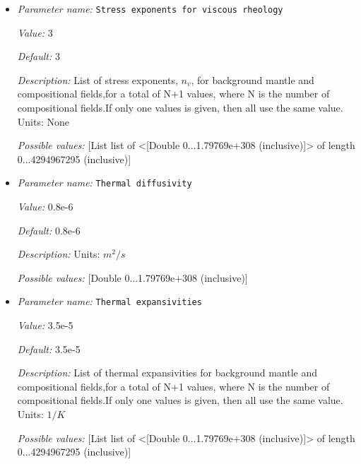 \begin{itemize}
{\it Description:} List of stress exponents, $n_p$, for background mantle and compositional fields,for a total of N+1 values, where N is the number of compositional fields.If only one values is given, then all use the same value.  Units: None


{\it Possible values:} [List list of <[Double 0...1.79769e+308 (inclusive)]> of length 0...4294967295 (inclusive)]
\item {\it Parameter name:} {\tt Stress exponents for viscous rheology}
\label{parameters:Material model/Morency and Doin/Stress exponents for viscous rheology}


{\it Value:} 3


{\it Default:} 3


{\it Description:} List of stress exponents, $n_v$, for background mantle and compositional fields,for a total of N+1 values, where N is the number of compositional fields.If only one values is given, then all use the same value.  Units: None


{\it Possible values:} [List list of <[Double 0...1.79769e+308 (inclusive)]> of length 0...4294967295 (inclusive)]
\item {\it Parameter name:} {\tt Thermal diffusivity}
\label{parameters:Material model/Morency and Doin/Thermal diffusivity}


{\it Value:} 0.8e-6


{\it Default:} 0.8e-6


{\it Description:} Units: $m^2/s$


{\it Possible values:} [Double 0...1.79769e+308 (inclusive)]
\item {\it Parameter name:} {\tt Thermal expansivities}
\label{parameters:Material model/Morency and Doin/Thermal expansivities}


{\it Value:} 3.5e-5


{\it Default:} 3.5e-5


{\it Description:} List of thermal expansivities for background mantle and compositional fields,for a total of N+1 values, where N is the number of compositional fields.If only one values is given, then all use the same value.  Units: $1 / K$


{\it Possible values:} [List list of <[Double 0...1.79769e+308 (inclusive)]> of length 0...4294967295 (inclusive)]
\end{itemize}

